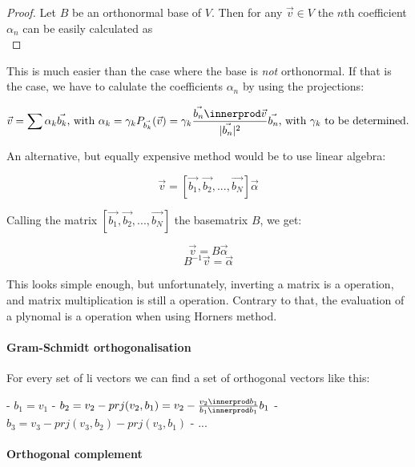 \begin{proof} Let $B$ be an orthonormal base of $V$. Then for any $\vec{v} \in V$ the $n$th coefficient $\alpha_n$ can be easily calculated as  \\


\end{proof}

This is much easier than the case where the base is \emph{not} orthonormal. If that is the case, we have to calulate the coefficients $\alpha_n$ by using the projections: 

$$ \vec{v} = \sum \alpha_k \vec{b_k} \text{, with } \alpha_k = \gamma_k P_{\vec{b_k}}(\vec{v}) =  \gamma_k \frac{\vec{b_n} \innerprod \vec{v}}{|\vec{b_n}|^2}\vec{b_n} \text{, with  $\gamma_k$ to be determined.}$$

An alternative, but equally expensive method would be to use linear algebra:

$$ \vec{v} = [\vec{b_1}, \vec{b_2}, ..., \vec{b_N}  ] \vec{\alpha} $$

Calling the matrix $[\vec{b_1}, \vec{b_2}, ..., \vec{b_N}  ]$ the basematrix $B$, we get: 

$$ \vec{v} = B \vec{\alpha} $$
$$ B^{-1} \vec{v} = \vec{\alpha} $$

This looks simple enough, but unfortunately, inverting a matrix is a  operation, and matrix multiplication is still a  operation. Contrary to that, the evaluation of a plynomal is a  operation when using Horners method. 

\paragraph{Gram-Schmidt orthogonalisation} For every set of li vectors we can find a set of orthogonal vectors like this: 

    - $b_1 = v_1$
    - $b_2 = v_2 - prj(v_2, b_1) = v_2 - \frac{v_2 \innerprod b_1}{b_1 \innerprod b_1}b_1$
    - $b_3 = v_3 - prj(v_3, b_2) - prj(v_3, b_1)$
    - ...


\paragraph{Orthogonal complement}


